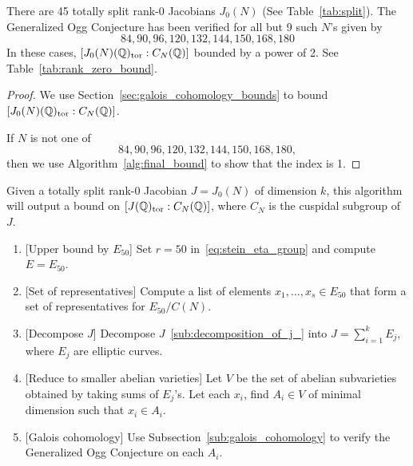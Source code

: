 

\begin{theorem}%
    \label{thm:verification_rank_zero}
    There are 45 totally split rank-0 Jacobians $J_0(N)$ (See
    Table~\ref{tab:split}). The Generalized Ogg Conjecture has been verified
    for all but 9 such $N$'s given by
    \[
        84,90,96,120,132,144,150,168,180
    \]
    In these cases, $[J_0(N)(\mathbb{Q})_{\mathrm{tor}}:C_N(\mathbb{Q})]$ bounded by a power of 2. See
    Table~\ref{tab:rank_zero_bound}.
\end{theorem}
\begin{proof}
    We use Section~\ref{sec:galois_cohomology_bounds} to bound
    $[J_0(N)(\mathbb{Q})_{\mathrm{tor}}:C_N(\mathbb{Q})]$.

    If $N$ is not one of 
    \[
        84,90,96,120,132,144,150,168,180,
    \]
    then we use Algorithm~\ref{alg:final_bound} to show that the index is 1.
\end{proof}
\begin{algorithm}[]%
    \label{alg:final_bound}
    Given a totally split rank-0 Jacobian $J=J_0(N)$ of dimension $k$, this
    algorithm will output a bound on $[J(\mathbb{Q})_{\mathrm{tor}}:C_N(\mathbb{Q})]$, where $C_N$ is
    the cuspidal subgroup of $J$.
    \begin{enumerate}
        \item{} [Upper bound by $E_{50}$]
            Set $r=50$ in~\eqref{eq:stein_eta_group} and compute $E=E_{50}$.
        \item{} [Set of representatives]
            Compute a list of elements $x_1,\ldots,x_s\in E_{50}$ that form a
            set of representatives for $E_{50}/C(N)$.
        \item{} [Decompose $J$]
            Decompose $J$~\ref{sub:decomposition_of_j_} into $J=\sum_{i=1} ^k
            E_j$, where $E_j$ are elliptic curves. 
        \item{} [Reduce to smaller abelian varieties]
            Let $V$ be the set of abelian subvarieties obtained by taking sums
            of $E_j$'s. Let each $x_i$, find $A_i\in V$ of minimal dimension
            such that $x_i\in A_i$.
        \item{} [Galois cohomology]
            Use Subsection~\ref{sub:galois_cohomology} to verify the
            Generalized Ogg Conjecture on each $A_i$.
    \end{enumerate}
\end{algorithm}

